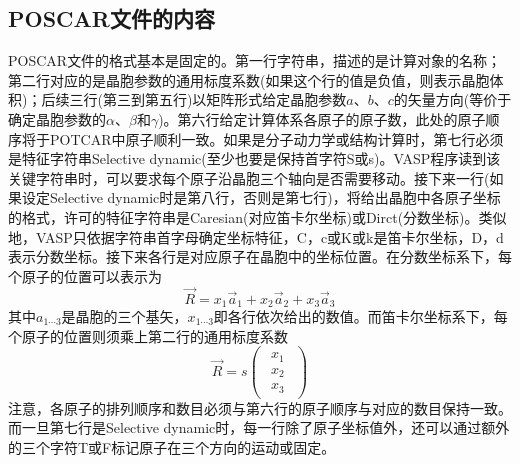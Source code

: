 \subsection{\rm{POSCAR}文件的内容}
{\fontsize{9.2pt}{7.2pt}\selectfont{
}}
\textrm{POSCAR}文件的格式基本是固定的。第一行字符串，描述的是计算对象的名称；第二行对应的是晶胞参数的通用标度系数(如果这个行的值是负值，则表示晶胞体积)；后续三行(第三到第五行)以矩阵形式给定晶胞参数$a$、$b$、$c$的矢量方向(等价于确定晶胞参数的$\alpha$、$\beta$和$\gamma$)。第六行给定计算体系各原子的原子数，此处的原子顺序将于\textrm{POTCAR}中原子顺利一致。如果是分子动力学或结构计算时，第七行必须是特征字符串\textrm{Selective dynamic}(至少也要是保持首字符\textrm{S}或\textrm{s})。\textrm{VASP}程序读到该关键字符串时，可以要求每个原子沿晶胞三个轴向是否需要移动。接下来一行(如果设定\textrm{Selective dynamic}时是第八行，否则是第七行)，将给出晶胞中各原子坐标的格式，许可的特征字符串是\textrm{Caresian}(对应笛卡尔坐标)或\textrm{Dirct}(分数坐标)。类似地，\textrm{VASP}只依据字符串首字母确定坐标特征，\textrm{C}，\textrm{c}或\textrm{K}或\textrm{k}是笛卡尔坐标，\textrm{D}，\textrm{d}表示分数坐标。接下来各行是对应原子在晶胞中的坐标位置。在分数坐标系下，每个原子的位置可以表示为
\begin{equation}
	\vec R=x_1\vec a_1+x_2\vec a_2+x_3\vec a_3
	\label{eq:diract-mode}
\end{equation}
其中$a_{1\cdots 3}$是晶胞的三个基矢，$x_{1\cdots 3}$即各行依次给出的数值。而笛卡尔坐标系下，每个原子的位置则须乘上第二行的通用标度系数
\begin{equation}
	\vec R=s
	\begin{pmatrix}
		\begin{aligned}
			x_1\\x_2\\x_3
		\end{aligned}
	\end{pmatrix}
	\label{eq:Cartensian-mode}
\end{equation}
注意，各原子的排列顺序和数目必须与第六行的原子顺序与对应的数目保持一致。而一旦第七行是\textrm{Selective dynamic}时，每一行除了原子坐标值外，还可以通过额外的三个字符\textrm{T}或\textrm{F}标记原子在三个方向的运动或固定。

